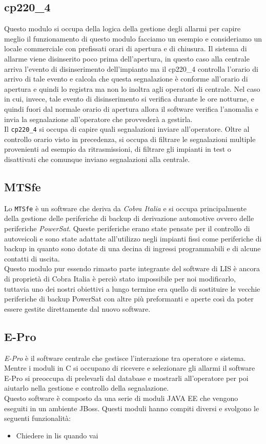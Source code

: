\subsection{cp220\_4}
Questo modulo si occupa della logica della gestione degli allarmi per capire meglio il funzionamento di questo modulo facciamo un esempio e consideriamo un locale commerciale con prefissati orari di apertura e di chiusura. Il sistema di allarme viene disinserito poco prima dell'apertura, in questo caso alla centrale arriva l'evento di disinserimento dell'impianto ma il cp220\_4 controlla l'orario di arrivo di tale evento e calcola che questa segnalazione è conforme all'orario di apertura e quindi lo registra ma non lo inoltra agli operatori di centrale. Nel caso in cui, invece, tale evento di disinserimento si verifica durante le ore notturne, e quindi fuori dal normale orario di apertura allora il software verifica l'anomalia e invia la segnalazione all'operatore che provvederà a gestirla.\\
Il \texttt{cp220\_4} si occupa di capire quali segnalazioni inviare all'operatore. Oltre al controllo orario visto in precedenza, si occupa di filtrare le segnalazioni multiple provenienti ad esempio da ritrasmissioni, di filtrare gli impianti in test o disattivati che comunque inviano segnalazioni alla centrale.
\subsection{MTSfe}
Lo \texttt{MTSfe} è un software che deriva da \emph{Cobra Italia} e si occupa principalmente della gestione delle periferiche di backup di derivazione automotive ovvero delle periferiche \emph{PowerSat}. Queste periferiche erano state pensate per il controllo di autoveicoli e sono state adattate all'utilizzo negli impianti fissi come periferiche di backup in quanto sono dotate di una decina di ingressi programmabili e di alcune contatti di uscita.\\
Questo modulo pur essendo rimasto parte integrante del software di LIS è ancora di proprietà di Cobra Italia è perciò stato impossibile per noi modificarlo, tuttavia uno dei nostri obiettivi a lungo termine era quello di sostituire le vecchie periferiche di backup PowerSat con altre più preformanti e aperte così da poter essere gestite direttamente dal nuovo software.
\subsection{E-Pro}
\emph{E-Pro} è il software centrale che gestisce l'interazione tra operatore e sistema. Mentre i moduli in C si occupano di ricevere e selezionare gli allarmi il software E-Pro si preoccupa di prelevarli dal database e mostrarli all'operatore per poi aiutarlo nella gestione e controllo della segnalazione.\\
Questo software è composto da una serie di moduli JAVA EE che vengono eseguiti in un ambiente JBoss. Questi moduli hanno compiti diversi e svolgono le seguenti funzionalità:
\begin{itemize}
	\item Chiedere in lis quando vai
\end{itemize}
